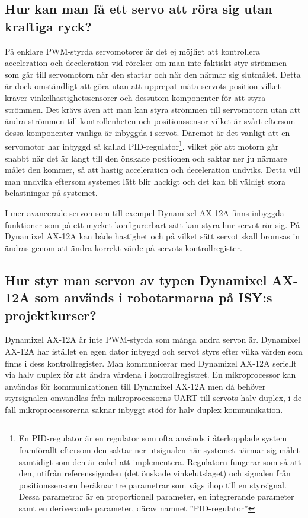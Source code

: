 \documentclass[a4paper,12pt]{article}
\begin{document}
\subsection{Hur kan man få ett servo att röra sig utan kraftiga ryck?}
På enklare PWM-styrda servomotorer är det ej möjligt att kontrollera acceleration och deceleration vid rörelser om man inte faktiskt styr strömmen som går till servomotorn när den startar och när den närmar sig slutmålet. Detta är dock omständligt att göra utan att upprepat mäta servots position vilket kräver vinkelhastighetssensorer och dessutom komponenter för att styra strömmen. Det krävs även att man kan styra strömmen till servomotorn utan att ändra strömmen till kontrollenheten och positionssensor vilket är svårt eftersom dessa komponenter vanliga är inbyggda i servot. Däremot är det vanligt att en servomotor har inbyggd så kallad PID-regulator\footnote{En PID-regulator är en regulator som ofta används i återkopplade system framförallt eftersom den saktar ner utsignalen när systemet närmar sig målet samtidigt som den är enkel att implementera. Regulatorn fungerar som så att den, utifrån referenssignalen (det önskade vinkelutslaget) och signalen från positionssensorn beräknar tre parametrar som vägs ihop till en styrsignal. Dessa parametrar är en proportionell parameter, en integrerande parameter samt en deriverande parameter, därav namnet ”PID-regulator”}, vilket gör att motorn går snabbt när det är långt till den önskade positionen och saktar ner ju närmare målet den kommer, så att hastig acceleration och deceleration undviks. Detta vill man undvika eftersom systemet lätt blir hackigt och det kan bli väldigt stora belastningar på systemet. 

I mer avancerade servon som till exempel Dynamixel AX-12A finns inbyggda funktioner som på ett mycket konfigurerbart sätt kan styra hur servot rör sig. På Dynamixel AX-12A kan både hastighet och på vilket sätt servot skall bromsas in ändras genom att ändra korrekt värde på servots kontrollregister. 

\subsection{Hur styr man servon av typen Dynamixel AX-12A som används i robotarmarna på ISY:s projektkurser?}
Dynamixel AX-12A är inte PWM-styrda som många andra servon är. Dynamixel AX-12A har istället en egen dator inbyggd och servot styrs efter vilka värden som finns i dess kontrollregister. Man kommunicerar med Dynamixel AX-12A seriellt via halv duplex för att ändra värdena i kontrollregistret. En mikroprocessor kan användas för kommunikationen till Dynamixel AX-12A men då behöver styrsignalen omvandlas från mikroprocessorns UART till servots halv duplex, i de fall mikroprocessorerna saknar inbyggt stöd för halv duplex kommunikation.
\newpage
\end{document}
